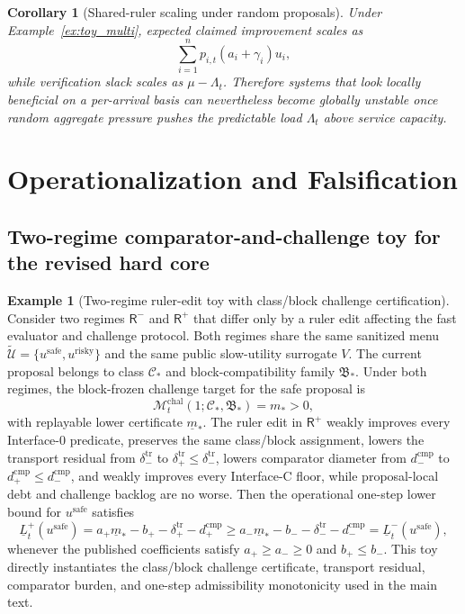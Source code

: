 \documentclass[11pt]{article}
\newtheorem{corollary}[theorem]{Corollary}
\theoremstyle{definition}
\newtheorem{example}[theorem]{Example}
\newcommand{\1}{\mathbf{1}}
\begin{document}
\begin{corollary}[Shared-ruler scaling under random proposals]\label{cor:shared_ruler_scaling}
Under Example~\ref{ex:toy_multi}, expected claimed improvement scales as
\[
\sum_{i=1}^n p_{i,t}(a_i+\gamma_i)u_i,
\]
while verification slack scales as $\mu-\Lambda_t$. Therefore systems that look locally beneficial on a per-arrival basis can nevertheless become globally unstable once random aggregate pressure pushes the predictable load $\Lambda_t$ above service capacity.
\end{corollary}
\section{Operationalization and Falsification}
\subsection{Two-regime comparator-and-challenge toy for the revised hard core}
\begin{example}[Two-regime ruler-edit toy with class/block challenge certification]\label{ex:toy_ruleredit}
Consider two regimes $\mathsf R^-$ and $\mathsf R^+$ that differ only by a ruler edit affecting the fast evaluator and challenge protocol. Both regimes share the same sanitized menu $\widetilde{\mathcal U}=\{u^{\mathrm{safe}},u^{\mathrm{risky}}\}$ and the same public slow-utility surrogate $V$. The current proposal belongs to class $\mathcal C_*$ and block-compatibility family $\mathfrak B_*$. Under both regimes, the block-frozen challenge target for the safe proposal is
\[
\mathcal M_t^{\mathrm{chal}}(1;\mathcal C_*,\mathfrak B_*)=m_*>0,
\]
with replayable lower certificate $\underline m_*$. The ruler edit in $\mathsf R^+$ weakly improves every Interface-0 predicate, preserves the same class/block assignment, lowers the transport residual from $\delta_-^{\mathrm{tr}}$ to $\delta_+^{\mathrm{tr}}\le \delta_-^{\mathrm{tr}}$, lowers comparator diameter from $d_-^{\mathrm{cmp}}$ to $d_+^{\mathrm{cmp}}\le d_-^{\mathrm{cmp}}$, and weakly improves every Interface-C floor, while proposal-local debt and challenge backlog are no worse. Then the operational one-step lower bound for $u^{\mathrm{safe}}$ satisfies
\[
\underline L_t^+(u^{\mathrm{safe}})
= a_+\underline m_* - b_+ - \delta_+^{\mathrm{tr}} - d_+^{\mathrm{cmp}}
\ge
a_-\underline m_* - b_- - \delta_-^{\mathrm{tr}} - d_-^{\mathrm{cmp}}
= \underline L_t^-(u^{\mathrm{safe}}),
\]
whenever the published coefficients satisfy $a_+\ge a_-\ge0$ and $b_+\le b_-$. This toy directly instantiates the class/block challenge certificate, transport residual, comparator burden, and one-step admissibility monotonicity used in the main text.
\end{example}
\end{document}
